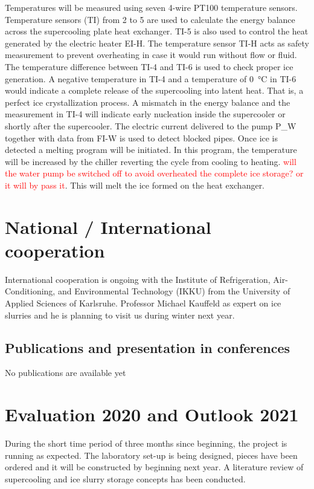 \documentclass[english]{SFOEYearlyReportEnglish_2018}
\begin{document}
Temperatures will be measured using seven 4-wire PT100 temperature sensors. Temperature sensors (TI) from 2 to 5 are used to calculate the energy balance across the supercooling plate heat exchanger. TI-5 is also used to control the heat generated by the electric heater EI-H. The temperature sensor TI-H acts as safety measurement to prevent overheating in case it would run without flow or fluid. The temperature difference between TI-4 and TI-6 is used to check proper ice generation. A negative temperature in TI-4 and a temperature of \SI{0}{\celsius} in TI-6 would indicate a complete release of the  supercooling into latent heat. That is, a perfect ice crystallization process. A mismatch in the energy balance and the measurement in TI-4 will indicate early nucleation inside the supercooler or shortly after the supercooler. The electric current delivered to the pump  P\_W together with data from FI-W is used to detect blocked pipes. Once ice is detected a melting program will be initiated. In this program, the temperature will be increased by the chiller reverting the cycle from cooling to heating.
\textcolor{red}{will the water pump  be switched off to avoid overheated the complete ice storage? or it will by pass it}. This will melt the ice formed on the heat exchanger.





\section{National / International cooperation}

International cooperation is ongoing with the Institute of Refrigeration, Air-Conditioning, and Environmental Technology (IKKU) from the University of Applied Sciences of Karlsruhe. Professor Michael Kauffeld as expert on ice slurries and he is planning to visit us during winter next year.

\subsection{Publications and presentation in conferences}
\label{sec:publications}
No publications are available yet

\section{Evaluation 2020 and Outlook 2021}

During the short time period of three months since beginning, the project is running as expected. 
The laboratory set-up is being designed, pieces have been ordered and it will be constructed by beginning next year. A literature review of supercooling and ice slurry storage concepts has been conducted.
\end{document}
